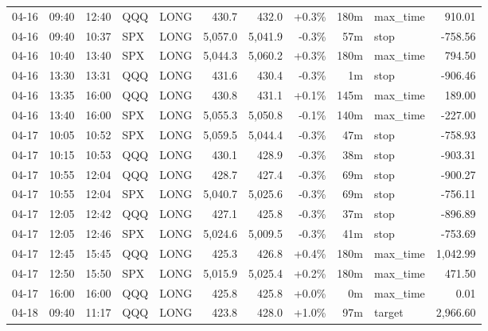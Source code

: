 \documentclass[11pt,a4paper,twoside]{article}
\begin{document}
\begin{center}
\begin{longtable}{>{\color{txtmain}}l l l l l r r r r >{\color{txtmain}}l r}
04-16 & 09:40 & 12:40 & QQQ & LONG & 430.7 & 432.0 & \textcolor{wingreen}{+0.3\%} & 180m & max\_time & \textcolor{wingreen}{910.01} \\
04-16 & 09:40 & 10:37 & SPX & LONG & 5,057.0 & 5,041.9 & \textcolor{lossred}{-0.3\%} & 57m & stop & \textcolor{lossred}{-758.56} \\
04-16 & 10:40 & 13:40 & SPX & LONG & 5,044.3 & 5,060.2 & \textcolor{wingreen}{+0.3\%} & 180m & max\_time & \textcolor{wingreen}{794.50} \\
04-16 & 13:30 & 13:31 & QQQ & LONG & 431.6 & 430.4 & \textcolor{lossred}{-0.3\%} & 1m & stop & \textcolor{lossred}{-906.46} \\
04-16 & 13:35 & 16:00 & QQQ & LONG & 430.8 & 431.1 & \textcolor{wingreen}{+0.1\%} & 145m & max\_time & \textcolor{wingreen}{189.00} \\
04-16 & 13:40 & 16:00 & SPX & LONG & 5,055.3 & 5,050.8 & \textcolor{lossred}{-0.1\%} & 140m & max\_time & \textcolor{lossred}{-227.00} \\
04-17 & 10:05 & 10:52 & SPX & LONG & 5,059.5 & 5,044.4 & \textcolor{lossred}{-0.3\%} & 47m & stop & \textcolor{lossred}{-758.93} \\
04-17 & 10:15 & 10:53 & QQQ & LONG & 430.1 & 428.9 & \textcolor{lossred}{-0.3\%} & 38m & stop & \textcolor{lossred}{-903.31} \\
04-17 & 10:55 & 12:04 & QQQ & LONG & 428.7 & 427.4 & \textcolor{lossred}{-0.3\%} & 69m & stop & \textcolor{lossred}{-900.27} \\
04-17 & 10:55 & 12:04 & SPX & LONG & 5,040.7 & 5,025.6 & \textcolor{lossred}{-0.3\%} & 69m & stop & \textcolor{lossred}{-756.11} \\
04-17 & 12:05 & 12:42 & QQQ & LONG & 427.1 & 425.8 & \textcolor{lossred}{-0.3\%} & 37m & stop & \textcolor{lossred}{-896.89} \\
04-17 & 12:05 & 12:46 & SPX & LONG & 5,024.6 & 5,009.5 & \textcolor{lossred}{-0.3\%} & 41m & stop & \textcolor{lossred}{-753.69} \\
04-17 & 12:45 & 15:45 & QQQ & LONG & 425.3 & 426.8 & \textcolor{wingreen}{+0.4\%} & 180m & max\_time & \textcolor{wingreen}{1,042.99} \\
04-17 & 12:50 & 15:50 & SPX & LONG & 5,015.9 & 5,025.4 & \textcolor{wingreen}{+0.2\%} & 180m & max\_time & \textcolor{wingreen}{471.50} \\
04-17 & 16:00 & 16:00 & QQQ & LONG & 425.8 & 425.8 & \textcolor{wingreen}{+0.0\%} & 0m & max\_time & \textcolor{wingreen}{0.01} \\
04-18 & 09:40 & 11:17 & QQQ & LONG & 423.8 & 428.0 & \textcolor{wingreen}{+1.0\%} & 97m & target & \textcolor{wingreen}{2,966.60} \\

\end{longtable}
\end{center}
\end{document}
